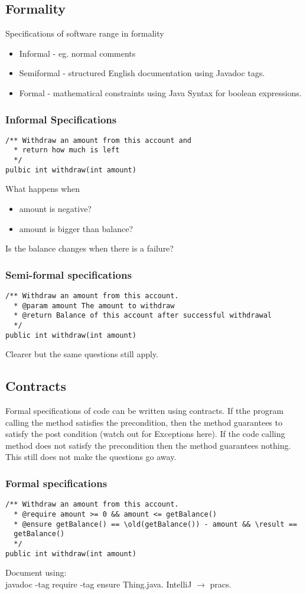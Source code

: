 \documentclass{article}
\theoremstyle{remark}
\theoremstyle{definition}
\begin{document}
\subsection*{Formality}
Specifications of software range in formality
\begin{itemize}
  \item Informal - eg. normal comments
  \item Semiformal - structured English documentation using Javadoc tags.
  \item Formal - mathematical constraints using Java Syntax for boolean
    expressions.
\end{itemize}

\subsubsection*{Informal Specifications}
\begin{lstlisting}
/** Withdraw an amount from this account and 
  * return how much is left
  */
pulbic int withdraw(int amount)
\end{lstlisting}
What happens when 
\begin{itemize}
  \item amount is negative?
  \item amount is bigger than balance?
\end{itemize}
Is the balance changes when there is a failure?
\subsubsection*{Semi-formal specifications}
\begin{lstlisting}
/** Withdraw an amount from this account.
  * @param amount The amount to withdraw
  * @return Balance of this account after successful withdrawal
  */
public int withdraw(int amount)
\end{lstlisting}
Clearer but the same questions still apply.
\subsection*{Contracts}
Formal specifications of code can be written using contracts. If tthe program
calling the method satisfies the precondition, then
the method guarantees to satisfy the post condition (watch out for Exceptions here). If the code calling method does not satisfy the precondition then the
method guarantees nothing. This still does not make the questions go away.

\subsubsection*{Formal specifications}
\begin{lstlisting}
/** Withdraw an amount from this account.
  * @require amount >= 0 && amount <= getBalance()
  * @ensure getBalance() == \old(getBalance()) - amount && \result ==
  getBalance()
  */
public int withdraw(int amount)
\end{lstlisting}
Document using: \\
javadoc -tag require -tag ensure Thing.java. IntelliJ $ \rightarrow $ pracs.
\end{document}
